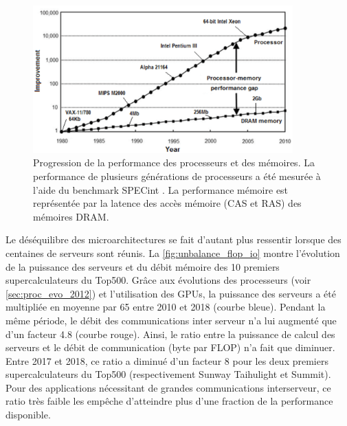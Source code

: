             \begin{figure}             \center             \includegraphics[width=10cm]{images/cpu_cpu_vs_memory.png}             \caption{\label{pic:cpuvsmemory2} Progression de la performance des processeurs et des mémoires. La performance de plusieurs générations de processeurs a été mesurée à l'aide du benchmark SPECint \cite{Efnusheva2017ASO}. La performance mémoire est représentée par la latence des accès mémoire (CAS et RAS) des mémoires DRAM.}
            \end{figure}
            
            Le déséquilibre des microarchitectures se fait d'autant plus ressentir lorsque des centaines de serveurs sont réunis. La \autoref{fig:unbalance_flop_io} montre l'évolution de la puissance des serveurs et du débit mémoire des 10 premiers supercalculateurs du Top500. Grâce aux évolutions des processeurs (voir \autoref{sec:proc_evo_2012}) et l'utilisation des GPUs, la puissance des serveurs a été multipliée en moyenne par 65 entre 2010 et 2018 (courbe bleue). Pendant la même période, le débit des communications inter serveur n'a lui augmenté que d'un facteur 4.8 (courbe rouge). Ainsi, le ratio entre la puissance de calcul des serveurs et le débit de communication (byte par \gls{FLOP}) n'a fait que diminuer. Entre 2017 et 2018, ce ratio a diminué d'un facteur 8 pour les deux premiers supercalculateurs du Top500 (respectivement Sunway Taihulight et Summit). Pour des applications nécessitant de grandes communications interserveur, ce ratio très faible les empêche d'atteindre plus d’une fraction de la performance disponible.
            
